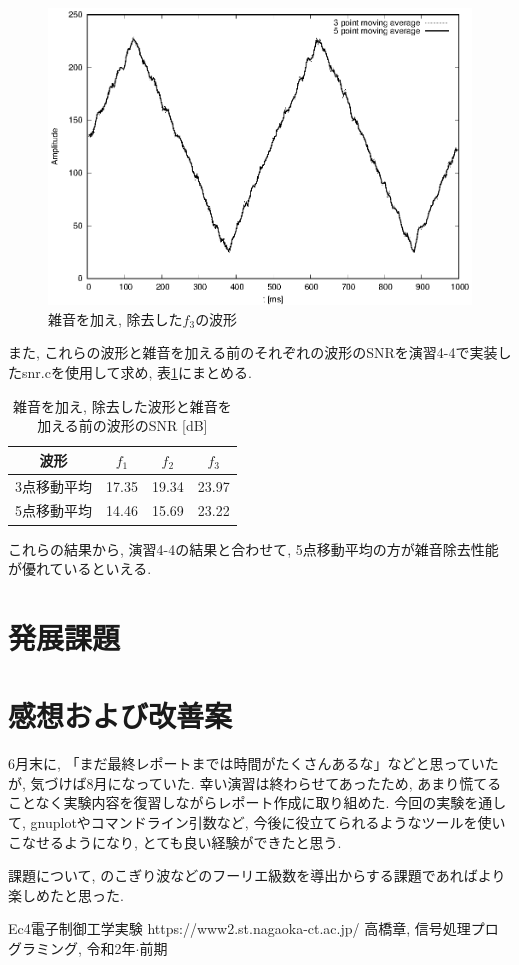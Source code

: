 \documentclass[titlepage]{jsarticle}
\begin{document}
    \begin{figure}[h]
        \centering
        \includegraphics[width=0.8\hsize]{images/f3mv.eps}
        \caption{雑音を加え, 除去した$f_3$の波形}
        \label{fig:f3mv}
    \end{figure}

    また, これらの波形と雑音を加える前のそれぞれの波形のSNRを演習4-4で実装したsnr.cを使用して求め,
    表\ref{tab:fsnr}にまとめる.

    \begin{table}[h]
        \centering
        \caption{雑音を加え, 除去した波形と雑音を加える前の波形のSNR [dB]}
        \label{tab:fsnr}
        \begin{tabular}{c|ccc} \hline
            波形 & $f_1$ & $f_2$ & $f_3$ \\ \hline \hline
            3点移動平均 & 17.35 & 19.34 & 23.97 \\
            5点移動平均 & 14.46 & 15.69 & 23.22 \\ \hline
        \end{tabular}
    \end{table}

    これらの結果から, 演習4-4の結果と合わせて, 5点移動平均の方が雑音除去性能が優れているといえる.

\section{発展課題}

\section{感想および改善案}
    6月末に, 「まだ最終レポートまでは時間がたくさんあるな」などと思っていたが,
    気づけば8月になっていた.
    幸い演習は終わらせてあったため, あまり慌てることなく実験内容を復習しながらレポート作成に取り組めた.
    今回の実験を通して, gnuplotやコマンドライン引数など, 今後に役立てられるようなツールを使いこなせるようになり,
    とても良い経験ができたと思う.

    課題について, のこぎり波などのフーリエ級数を導出からする課題であればより楽しめたと思った.

\begin{thebibliography}{99}
     Ec4電子制御工学実験 https://www2.st.nagaoka-ct.ac.jp/
     高橋章, 信号処理プログラミング, 令和2年$\cdot$前期
\end{thebibliography}
\end{document}
